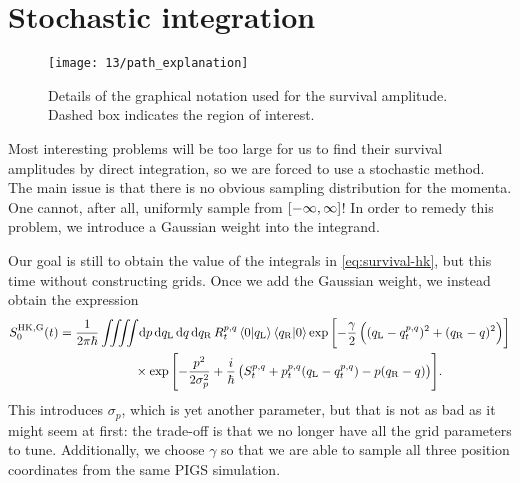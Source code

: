 \section{Stochastic integration}


\begin{figure}[h]
	\centering
	\texttt{[image: 13/path\_explanation]}
	\caption[
		Graphical notation for survival amplitude
	]{
		Details of the graphical notation used for the survival amplitude.
		Dashed box indicates the region of interest.
	}
	\label{fig:survival-path-explanation}
\end{figure}

Most interesting problems will be too large for us to find their survival amplitudes by direct integration, so we are forced to use a stochastic method.
The main issue is that there is no obvious sampling distribution for the momenta.
One cannot, after all, uniformly sample from $\intcc{-\infty, \infty}$!
In order to remedy this problem, we introduce a Gaussian weight into the integrand.

Our goal is still to obtain the value of the integrals in \vref{eq:survival-hk}, but this time without constructing grids.
Once we add the Gaussian weight, we instead obtain the expression
\begin{align}
	S_0\hkg(t)
	&= \frac{1}{2 \pi \hbar} \iiiint\! \dif p \dif q\LLup \dif q \dif q\RRup \,
			R\coh{p}{q}_t \braket{0 | q\LLup} \braket{q\RRup | 0}
			\expb{-\frac{\gamma}{2} \left( (q\LLup - q\coh{p}{q}_t)^2 + (q\RRup - q)^2 \right)} \notag \\
	&\qquad\qquad\qquad\times
			\expb{
				-\frac{p^2}{2 \sigma_p^2}
				+ \frac{i}{\hbar} \left( S\coh{p}{q}_t + p\coh{p}{q}_t (q\LLup - q\coh{p}{q}_t) - p (q\RRup - q) \right)
			}.
\end{align}
This introduces $\sigma_p$, which is yet another parameter, but that is not as bad as it might seem at first: the trade-off is that we no longer have all the grid parameters to tune.
Additionally, we choose $\gamma$ so that we are able to sample all three position coordinates from the same PIGS simulation.

